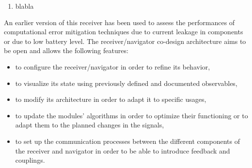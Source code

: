 \documentclass[conference]{IEEEtran}
\begin{document}
\begin{enumerate}
\item blabla
\end{enumerate}

An earlier version of this receiver has been used to assess the performances of computational error mitigation techniques \cite{Haf16} due to current leakage in components or due to low battery level.
The  receiver/navigator co-design architecture aims to be open and allows the following features:
\begin{itemize}
\item to configure the receiver/navigator in order to refine its behavior,
\item to visualize its state using previously defined and documented observables,
\item to modify its architecture in order to adapt it to specific usages,
\item to update the modules' algorithms in order to optimize their functioning or to adapt them to the planned changes in the signals,
\item to set up the communication processes between the different components of the receiver and navigator in order to be able to introduce feedback and couplings.
\end{itemize}
\end{document}
